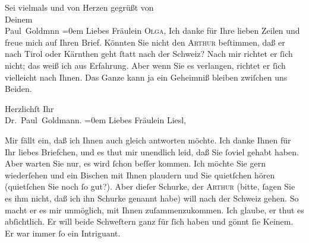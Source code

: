 \pstart
           {\pb}Sei vielmals und von Herzen gegrüßt von {\\[\baselineskip]}Deinem {\\[\baselineskip]}\spacefill\mbox{Paul Goldmnn}\pend
           \leftskip=0em{}\vspace{1em}{\vspace{1\baselineskip}}
\pstart
           Liebes Fräulein \textsc{Olga}, Ich
               danke für Ihre lieben Zeilen und freue mich auf Ihren Brief. Könnten Sie nicht den
                  \textsc{Arthur} beſtimmen, daß er nach Tirol oder Kärnthen geht{ }ſtatt nach der Schweiz? Nach mir richtet er{ }ſich nicht; das weiß ich aus Erfahrung. Aber wenn Sie es verlangen, richtet er{ }ſich
               vielleicht nach Ihnen. Das Ganze kann ja ein Geheimniß bleiben zwiſchen uns  Beiden.\pend
           
\pstart
           Herzlichſt Ihr {\\[\baselineskip]}\spacefill\mbox{Dr. Paul Goldmann.}\pend
           \leftskip=0em{}\vspace{1em}{\vspace{1\baselineskip}}
\pstart
           {\pb}Liebes Fräulein Liesl,\pend
           
\pstart
           Mir fällt ein, daß ich Ihnen auch gleich antworten möchte. Ich danke Ihnen für Ihr
               liebes Briefchen, und es thut mir unendlich leid, daß Sie{ }ſoviel \label{K_L03071-3v}\label{K_L03071-3} gehabt
               haben. Aber warten Sie nur, es wird{ }ſchon beſſer kommen. Ich möchte Sie gern
               wiederſehen und ein Bischen mit Ihnen plaudern und Sie quietſchen hören (quietſchen
               Sie noch{ }ſo gut?). Aber dieſer {\pb}Schurke, der \textsc{Arthur} (bitte, ſagen Sie es ihm \strikeout{\textcolor{gray}{×}\-\textcolor{gray}{×}\-\textcolor{gray}{×}} nicht, daß ich ihn Schurke genannt habe) will nach der Schweiz gehen. So macht er es mir unmöglich, mit Ihnen
               zuſammenzukommen. Ich glaube, er thut es abſichtlich. Er will beide Schweſtern ganz
               für{ }ſich haben und gönnt{ }ſie Keinem. Er war immer{ }ſo ein Intriguant.\pend
           
